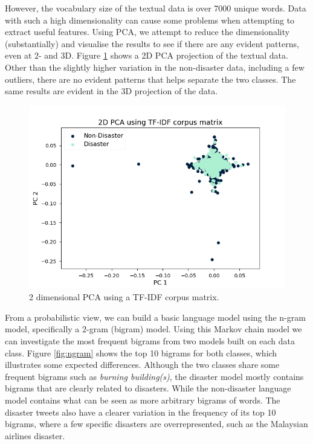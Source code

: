 \documentclass[journal, ]{IEEEtran}
\let\MYoriglatexcaption\caption
\renewcommand{\caption}[2][\relax]{\MYoriglatexcaption[#2]{#2}}
\begin{document}
However, the vocabulary size of the textual data is over 7000 unique words.
Data with such a high dimensionality can cause some problems when attempting
to extract useful features. Using PCA, we attempt to reduce the dimensionality
(substantially) and visualise the results to see if there are any evident
patterns, even at 2- and 3D. Figure \ref{fig:pca} shows a 2D PCA projection
of the textual data. Other than the slightly higher variation in the
non-disaster data, including a few outliers, there are no evident patterns that
helps separate the two classes. The same results are evident in the 3D
projection of the data. 

\begin{figure}[hbt!]
  \centering
  \includegraphics[width=\linewidth]{../figures/pca.png}
  \caption{2 dimensional PCA using a TF-IDF corpus matrix.}
  \label{fig:pca}
\end{figure}

From a probabilistic view, we can build a basic language model using the n-gram
model, specifically a 2-gram (bigram) model. Using this Markov chain model we
can investigate the most frequent bigrams from two models built on each data
class. Figure \ref{fig:ngram} shows the top 10 bigrams for both classes, which
illustrates some expected differences. Although the two classes share some
frequent bigrams such as \textit{burning building(s)}, the disaster model
mostly contains bigrams that are clearly related to disasters. While the
non-disaster language model contains what can be seen as more arbitrary bigrams
of words. The disaster tweets also have a clearer variation in the frequency of
its top 10 bigrams, where a few specific disasters are overrepresented, such as
the Malaysian airlines disaster.
\end{document}

